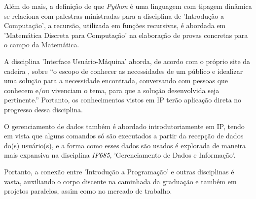 \documentclass[a4paper, 12pt]{article}
\begin{document}
Além do mais, a definição de que \textit{Python} é uma linguagem com tipagem dinâmica se relaciona com palestras ministradas para a disciplina de 'Introdução a Computação', a recursão, utilizada em funções recursivas, é abordada em 'Matemática Discreta para Computação' na elaboração de provas concretas para o campo da Matemática. 

A disciplina 'Interface Usuário-Máquina' aborda, de acordo com o próprio site da cadeira \cite{ifm}, sobre “o escopo de conhecer as necessidades de um público e idealizar uma solução para a necessidade encontrada, conversando com pessoas que conhecem e/ou vivenciam o tema, para que a solução desenvolvida seja pertinente.” Portanto, os conhecimentos vistos em IP terão aplicação direta no progresso dessa disciplina. 

O gerenciamento de dados também é abordado introdutoriamente em IP, tendo em vista que alguns comandos só são executados a partir da recepção de dados do(s) usuário(s), e a forma como esses dados são usados é explorada de maneira mais expansiva na disciplina \textit{IF685}, 'Gerenciamento de Dados e Informação'.

Portanto, a conexão entre 'Introdução a Programação' e outras disciplinas é vasta, auxiliando o corpo discente na caminhada da graduação e também em projetos paralelos, assim como no mercado de trabalho.


\newpage


\end{document}
